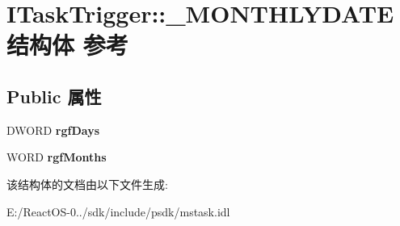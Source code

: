 \hypertarget{struct_i_task_trigger_1_1___m_o_n_t_h_l_y_d_a_t_e}{}\section{I\+Task\+Trigger\+:\+:\+\_\+\+M\+O\+N\+T\+H\+L\+Y\+D\+A\+T\+E结构体 参考}
\label{struct_i_task_trigger_1_1___m_o_n_t_h_l_y_d_a_t_e}
\subsection*{Public 属性}
\begin{DoxyCompactItemize}
\item 
\mbox{\label{struct_i_task_trigger_1_1___m_o_n_t_h_l_y_d_a_t_e_a5aaeff96b8412b31b6af39a957d8a4c8}} 
D\+W\+O\+RD {\bfseries rgf\+Days}
\item 
\mbox{\label{struct_i_task_trigger_1_1___m_o_n_t_h_l_y_d_a_t_e_a1daed1656267ce01564cbd385a98ad70}} 
W\+O\+RD {\bfseries rgf\+Months}
\end{DoxyCompactItemize}


该结构体的文档由以下文件生成\+:\begin{DoxyCompactItemize}
\item 
E\+:/\+React\+O\+S-\/0../sdk/include/psdk/mstask.\+idl\end{DoxyCompactItemize}
